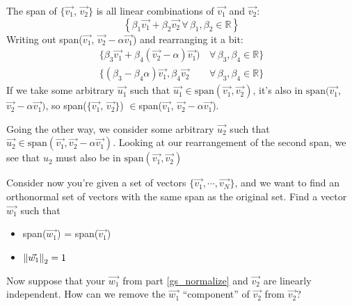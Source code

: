 \begin{enumerate}
{    The span of $\{\vec{v_1}$, $\vec{v_2}\}$ is all linear combinations of $\vec{v_1}$ and $\vec{v_2}$:
    $$\left\{\beta_1 \vec{v_1} + \beta_2 \vec{v_2} \,\forall\, \beta_1, \beta_2\in\mathbb{R}\right\}$$
    Writing out span($\vec{v_1}$, $\vec{v_2}-\alpha \vec{v_1}$) and rearranging it a bit:
    \begin{align*}
        \{\beta_3\vec{v_1} + \beta_4(\vec{v_2}-\alpha)\vec{v_1})\,&\forall\, \beta_3, \beta_4\in\mathbb{R}\}\\
        \{(\beta_3-\beta_4\alpha)\vec{v_1}, \beta_4\vec{v_2}\,&\forall\, \beta_3, \beta_4\in\mathbb{R}\}
    \end{align*}
    If we take some arbitrary $\vec{u_1}$ such that $\vec{u_1}\in\text{span}(\vec{v_1}, \vec{v_2})$, it's also in $\text{span}(\vec{v_1}$, $\vec{v_2}-\alpha \vec{v_1})$, so span($\{\vec{v_1}$, $\vec{v_2}\}$) $\in $span($\vec{v_1}$, $\vec{v_2}-\alpha \vec{v_1}$).

    Going the other way, we consider some arbitrary $\vec{u_2}$ such that $\vec{u_2}\in\text{span}(\vec{v_1}, \vec{v_2}-\alpha \vec{v_1})$. Looking at our rearrangement of the second span, we see that $u_2$ must also be in $\text{span}(\vec{v_1}, \vec{v_2})$}

\qitem\label{gs_normalize}{
    Consider now you're given a set of vectors $\{\vec{v_1}, \cdots ,\vec{v_N}\}$, and we want to find an orthonormal set of vectors with the same span as the original set. Find a vector $\vec{w_1}$ such that
    \begin{itemize}
        \item span($\vec{w_1}$) = span($\vec{v_1}$)
        \item $\left\lVert\vec{w_1}\right\rVert_2 = 1$
    \end{itemize}}



\qitem\label{gs_project_indep}{
    Now suppose that your $\vec{w_1}$ from part \ref{gs_normalize} and $\vec{v_2}$ are linearly independent. How can we remove the $\vec{w_1}$ ``component'' of $\vec{v_2}$ from $\vec{v_2}$?}



\end{enumerate}

